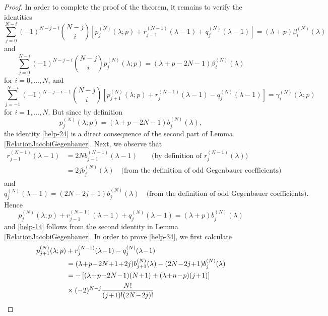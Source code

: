 \documentclass[a4paper,12pt,reqno]{amsart}
\numberwithin{theorem}{subsection}
\numberwithin{equation}{section}
\begin{document}
\begin{proof}
In order to complete the proof of the theorem, it remains to verify the
identities
\begin{equation}\label{help-14}
   \sum_{j=0}^{N-i}(-1)^{N-j-i} \binom{N\!-\!j}{i}
   \left[p_j^{(N)}(\lambda;p) \!+\! r_{j-1}^{(N-1)}(\lambda\!-\!1) \!+\! q_j^{(N)}(\lambda\!-\!1)\right]
   = (\lambda\!+\!p) \beta_i^{(N)}(\lambda)
\end{equation}
and
\begin{equation}\label{help-24}
   \sum_{j=0}^{N-i}(-1)^{N-j-i} \binom{N-j}{i} p_j^{(N)}(\lambda;p)
   = (\lambda\!+\!p\!-\!2N\!-\!1) \beta_i^{(N)}(\lambda)
\end{equation}
for $i=0,\dots,N$, and
\begin{equation}\label{help-34}
   \sum_{j=-1}^{N-i}(-1)^{N-j-i-1} \binom{N-j}{i}
   \left[p_{j+1}^{(N)}(\lambda;p)+r_{j}^{(N-1)}(\lambda\!-\!1)-q_j^{(N)}(\lambda\!-\!1)\right]
   = \gamma_i^{(N)}(\lambda;p)
\end{equation}
for $i=1,\dots,N$. But since by definition
$$
   p_j^{(N)}(\lambda;p) = (\lambda\!+\!p\!-\!2N\!-\!1) b_j^{(N)}(\lambda),
$$
the identity \eqref{help-24} is a direct consequence of the second part of
Lemma \ref{RelationJacobiGegenbauer}. Next, we observe that
\begin{align*}
   r_{j-1}^{(N-1)}(\lambda\!-\!1) & = 2N b_{j-1}^{(N-1)}(\lambda\!-\!1) \qquad
   \mbox{(by definition of $r_j^{(N-1)}(\lambda)$)} \\
   & = 2j b_j^{(N)}(\lambda) \quad \mbox{(from the definition of odd Gegenbauer coefficients)}
\end{align*}
and
$$
   q_j^{(N)}(\lambda\!-\!1) = (2N\!-\!2j\!+\!1) b_j^{(N)}(\lambda)
   \quad \mbox{(from the definition of odd Gegenbauer coefficients)}.
$$
Hence
$$
   p_j^{(N)}(\lambda;p) + r_{j-1}^{(N-1)}(\lambda\!-\!1) + q_j^{(N)}(\lambda\!-\!1)
   = (\lambda\!+\!p) b_j^{(N)}(\lambda)
$$
and \eqref{help-14} follows from the second identity in Lemma
\ref{RelationJacobiGegenbauer}. In order to prove \eqref{help-34}, we first
calculate
\begin{align}\label{sum-term}
   p_{j+1}^{(N)}(\lambda;p) & + r_j^{(N-1)}(\lambda\!-\!1) - q_j^{(N)}(\lambda\!-\!1) \notag \\
   & = (\lambda\!+\!p\!-\!2N\!+\!1\!+\!2j) b_{j+1}^{(N)}(\lambda) - (2N\!-\!2j\!+\!1)
   b_j^{(N)}(\lambda) \notag \\
   & = -\left[(\lambda\!+\!p\!-\!2N\!-\!1)(N\!+\!1) + (\lambda\!+\!n\!-\!p)(j\!+\!1)\right] \notag \\
   & \times (-2)^{N-j} \frac{N!}{(j\!+\!1)! (2N\!-\!2j)!}

\end{align}
\end{proof}
\end{document}
